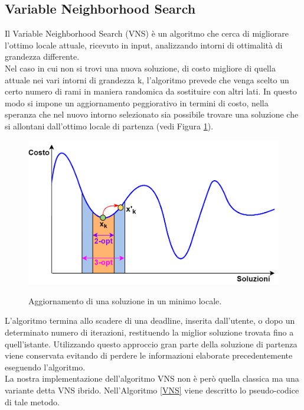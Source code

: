 \subsection{Variable Neighborhood Search}
Il Variable Neighborhood Search (VNS) è un algoritmo che cerca di migliorare l'ottimo locale attuale, ricevuto in input, analizzando intorni di ottimalità di grandezza differente.\\
Nel caso in cui non si trovi una nuova soluzione, di costo migliore di quella attuale nei vari intorni di grandezza k, l'algoritmo prevede che venga scelto un certo numero di rami in maniera randomica da sostituire con altri lati\cite{VNS_CITE}. In questo modo si impone un aggiornamento peggiorativo in termini di costo, nella speranza che nel nuovo intorno selezionato sia possibile trovare una soluzione che si allontani dall'ottimo locale di partenza (vedi Figura \ref{VNS_img}).\\
 \begin{figure}[H] 
\begin{center} 
  \includegraphics[scale=0.3]{Images/VNS}\\ 
  \caption{\footnotesize{Aggiornamento di una soluzione in un minimo locale.}}
  \label{VNS_img}
\end{center}
\end{figure}
L'algoritmo termina allo scadere di una deadline, inserita dall'utente, o dopo un determinato numero di iterazioni, restituendo la miglior soluzione trovata fino a quell'istante. Utilizzando questo approccio gran parte della soluzione di partenza viene conservata evitando di perdere le informazioni elaborate precedentemente eseguendo l'algoritmo.\\
La nostra implementazione dell'algoritmo VNS non è però quella classica ma una variante detta VNS ibrido\cite{hybrid_VNS}. Nell'Algoritmo \ref{VNS} viene descritto lo pseudo-codice di tale metodo.\\
